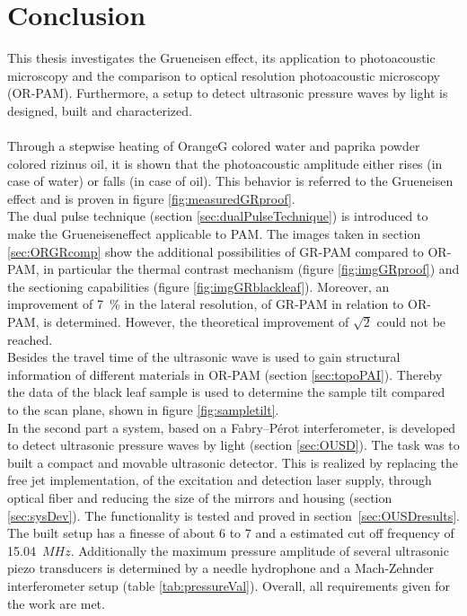 \section{Conclusion}

This thesis investigates the Grueneisen effect, its application to photoacoustic microscopy and the comparison to optical resolution photoacoustic microscopy (OR-PAM). Furthermore, a setup to detect ultrasonic pressure waves by light is designed, built and characterized. \\
\\
Through a stepwise heating of OrangeG colored water and paprika powder colored rizinus oil, it is shown that the photoacoustic amplitude either rises (in case of water) or falls (in case of oil). This behavior is referred to the Grueneisen effect and is proven in figure \ref{fig:measuredGRproof}.\\
The dual pulse technique (section \ref{sec:dualPulseTechnique}) is introduced to make the Grueneiseneffect applicable to PAM. The images taken in section \ref{sec:ORGRcomp} show the additional possibilities of GR-PAM compared to OR-PAM, in particular the thermal contrast mechanism (figure \ref{fig:imgGRproof}) and the sectioning capabilities (figure \ref{fig:imgGRblackleaf}). Moreover, an improvement of 7~$\%$ in the lateral resolution, of GR-PAM in relation to OR-PAM, is determined. However, the theoretical improvement of $\sqrt{2}$ could not be reached.\\
Besides the travel time of the ultrasonic wave is used to gain structural information of different materials in OR-PAM (section \ref{sec:topoPAI}). Thereby the data of the black leaf sample is used to determine the sample tilt compared to the scan plane, shown in figure \ref{fig:sampletilt}.\\
In the second part a system, based on a Fabry–P\'{e}rot interferometer, is developed to detect ultrasonic pressure waves by light (section \ref{sec:OUSD}). The task was to built a compact and movable ultrasonic detector. This is realized by replacing the free jet implementation, of the excitation and detection laser supply, through optical fiber and reducing the size of the mirrors and housing (section \ref{sec:sysDev}). The functionality is tested and proved in section~\ref{sec:OUSDresults}. The built setup has a finesse of about 6 to 7 and a estimated cut off frequency of 15.04~$MHz$.
Additionally the maximum pressure amplitude of several ultrasonic piezo transducers is determined by a needle hydrophone and a Mach-Zehnder interferometer setup (table \ref{tab:pressureVal}). Overall, all requirements given for the work are met.\\ \\

